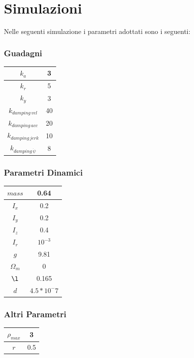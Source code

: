 \documentclass[a4paper,10pt]{article}
\begin{document}
\section{Simulazioni}
Nelle seguenti simulazione i parametri adottati sono i seguenti:
\begin{center}
\subsubsection*{Guadagni}
\begin{tabular}{|c|c|}
\hline $k_a$ & 3 \\
\hline $k_r$ & 5 \\
\hline $k_y$ & 3 \\
\hline $k_{damping\, vel}$ & 40 \\
\hline $k_{damping\, acc}$ & 20 \\
\hline $k_{damping\, jerk}$ & 10 \\
\hline $k_{damping\, \dot{\psi}}$ & 8\\
\hline
\end{tabular}

\subsubsection*{Parametri Dinamici}
\begin{tabular}{|c|c|}
\hline $mass$ & 0.64 \\
\hline $I_x$ & 0.2 \\
\hline $I_y$ & 0.2 \\
\hline $I_z$ & 0.4 \\
\hline $I_r$ & $10^{-3}$ \\
\hline $g$ & 9.81 \\
\hline $\Omega_m$ & 0\\
\hline $\l$ & 0.165\\
\hline $d$ & $4.5*10^-7$\\
\hline
\end{tabular}


\subsubsection*{Altri Parametri}
\begin{tabular}{|c|c|}
\hline $\rho_{max}$ & 3 \\
\hline $r$ & 0.5 \\
\hline
\end{tabular}
\end{center}
\end{document}
